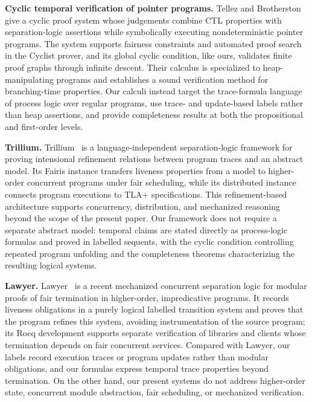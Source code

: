 \documentclass[manuscript,screen]{acmart}
\begin{document}
\textbf{Cyclic temporal verification of pointer programs.}
Tellez and Brotherston~\cite{Gadi20} give a cyclic proof system whose judgements combine CTL properties with separation-logic assertions while symbolically executing nondeterministic pointer programs.
The system supports fairness constraints and automated proof search in the Cyclist prover, and its global cyclic condition, like ours, validates finite proof graphs through infinite descent.
Their calculus is specialized to heap-manipulating programs and establishes a sound verification method for branching-time properties.
Our calculi instead target the trace-formula language of process logic over regular programs, use trace- and update-based labels rather than heap assertions, and provide completeness results at both the propositional and first-order levels.

\textbf{Trillium.}
Trillium~\cite{Trillium24} is a language-independent separation-logic framework for proving intensional refinement relations between program traces and an abstract model.
Its Fairis instance transfers liveness properties from a model to higher-order concurrent programs under fair scheduling, while its distributed instance connects program executions to TLA+ specifications.
This refinement-based architecture supports concurrency, distribution, and mechanized reasoning beyond the scope of the present paper.
Our framework does not require a separate abstract model: temporal claims are stated directly as process-logic formulas and proved in labelled sequents, with the cyclic condition controlling repeated program unfolding and the completeness theorems characterizing the resulting logical systems.

\textbf{Lawyer.}
Lawyer~\cite{Lawyer26} is a recent mechanized concurrent separation logic for modular proofs of fair termination in higher-order, impredicative programs.
It records liveness obligations in a purely logical labelled transition system and proves that the program refines this system, avoiding instrumentation of the source program; its Rocq development supports separate verification of libraries and clients whose termination depends on fair concurrent services.
Compared with Lawyer, our labels record execution traces or program updates rather than modular obligations, and our formulas express temporal trace properties beyond termination.
On the other hand, our present systems do not address higher-order state, concurrent module abstraction, fair scheduling, or mechanized verification.
\end{document}
